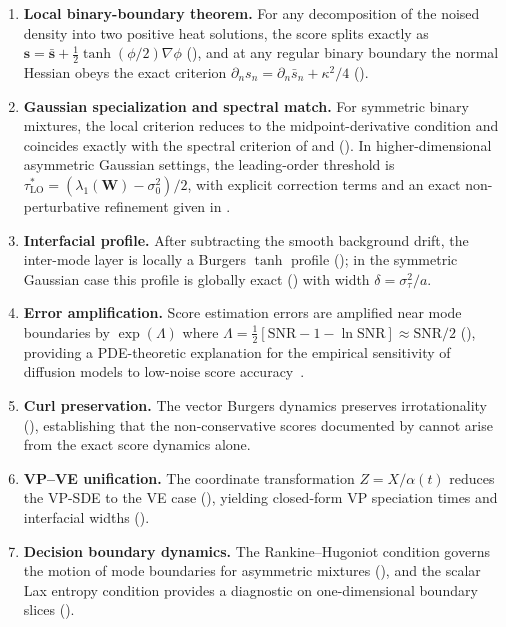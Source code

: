 \documentclass[11pt]{article}
\begin{document}
\begin{enumerate}[label=(\roman*),leftmargin=2em,nosep]
\item \textbf{Local binary-boundary theorem.}
For any decomposition of the noised density into two positive heat solutions, the score splits exactly as $\bm{s} = \bar{\bm{s}} + \tfrac{1}{2}\tanh(\phi/2)\nabla\phi$ (), and at any regular binary boundary the normal Hessian obeys the exact criterion $\partial_n s_n = \partial_n \bar s_n + \kappa^2/4$ ().

\item \textbf{Gaussian specialization and spectral match.}
For symmetric binary mixtures, the local criterion reduces to the midpoint-derivative condition and coincides exactly with the spectral criterion of \citet{raya2023spontaneous} and \citet{biroli2024dynamical} (). In higher-dimensional asymmetric Gaussian settings, the leading-order threshold is $\tau^\ast_{\mathrm{LO}} = (\lambda_1(\bm{W}) - \sigma_0^2)/2$, with explicit correction terms and an exact non-perturbative refinement given in .

\item \textbf{Interfacial profile.}
After subtracting the smooth background drift, the inter-mode layer is locally a Burgers $\tanh$ profile (); in the symmetric Gaussian case this profile is globally exact () with width $\delta = \sigma_\tau^2/a$.

\item \textbf{Error amplification.}
Score estimation errors are amplified near mode boundaries by $\exp(\Lambda)$ where $\Lambda = \tfrac{1}{2}[\mathrm{SNR} - 1 - \ln\mathrm{SNR}] \approx \mathrm{SNR}/2$ (), providing a PDE-theoretic explanation for the empirical sensitivity of diffusion models to low-noise score accuracy~\citep{song2020improved, karras2022elucidating}.

\item \textbf{Curl preservation.}
The vector Burgers dynamics preserves irrotationality (), establishing that the non-conservative scores documented by \citet{vuong2025score} cannot arise from the exact score dynamics alone.

\item \textbf{VP--VE unification.}
The coordinate transformation $Z = X/\alpha(t)$ reduces the VP-SDE to the VE case (), yielding closed-form VP speciation times and interfacial widths ().

\item \textbf{Decision boundary dynamics.}
The Rankine--Hugoniot condition governs the motion of mode boundaries for asymmetric mixtures (), and the scalar Lax entropy condition provides a diagnostic on one-dimensional boundary slices ().
\end{enumerate}
\end{document}
